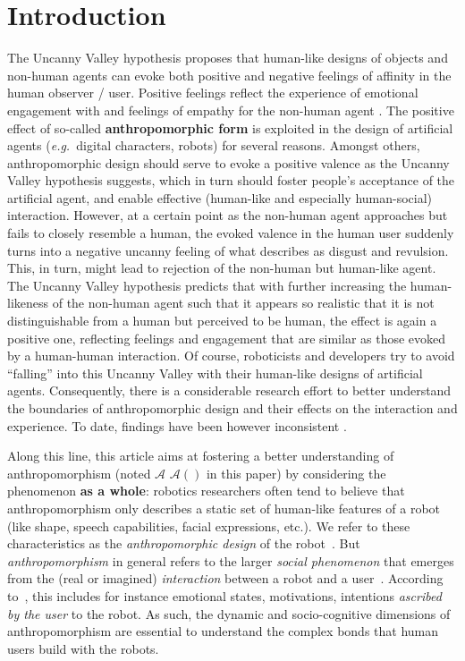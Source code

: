 \documentclass{frontiersSCNS} %
\newcommand{\eg}{{\textit{e.g.~}}}
\newcommand{\Ant}[1][]{%
      \ifthenelse{\isempty{#1}}%
        {$\mathcal{A}$}
        {$\mathcal{A}(#1)$}
}
\begin{document}
\section{Introduction}
\label{sec:intro}

The Uncanny Valley hypothesis \citep{mori_uncanny_1970} proposes that human-like
designs of objects and non-human agents can evoke both positive and negative feelings 
of affinity in the human observer / user. Positive feelings reflect the experience of 
emotional engagement with and feelings of empathy for the non-human agent
\citep{cheetham_human_2011}. The positive effect of so-called
\textbf{anthropomorphic form} is exploited in the design of artificial agents
(\eg digital characters, robots) for several reasons. Amongst others,
anthropomorphic design should serve to evoke a positive valence as the Uncanny
Valley hypothesis suggests, which in turn should foster people's acceptance of
the artificial agent, and enable effective (human-like and especially
human-social) interaction.  However, at a certain point as the non-human agent
approaches but fails to closely resemble a human, the evoked valence in the
human user suddenly turns into a negative uncanny feeling of what
\cite{mori_uncanny_1970} describes as disgust and revulsion. This, in turn,
might lead to rejection of the non-human but human-like agent.  The Uncanny
Valley hypothesis predicts that with further increasing the human-likeness of
the non-human agent such that it appears so realistic that it is not
distinguishable from a human but perceived to be human, the effect is again a
positive one, reflecting feelings and engagement that are similar as those
evoked by a human-human interaction.  Of course, roboticists and developers try
to avoid ``falling'' into this Uncanny Valley with their human-like designs of
artificial agents. Consequently, there is a considerable research effort to
better understand the boundaries of anthropomorphic design and their effects
on the interaction and experience. To date, findings have been however
inconsistent \citep{cheetham_human_2011}.

Along this line, this article aims at fostering a better understanding of
anthropomorphism (noted \Ant in this paper) by considering the phenomenon
\textbf{as a whole}: robotics researchers often tend to believe that
anthropomorphism only describes a static set of human-like features of a robot
(like shape, speech capabilities, facial expressions, etc.). We refer to these
characteristics as the \emph{anthropomorphic design} of the
robot~\cite{fink_anthropomorphism_2012}. But \emph{anthropomorphism} in general
refers to the larger \emph{social phenomenon} that emerges from the (real or
imagined) \emph{interaction} between a robot and a
user~\citep{persson_anthropomorphism_2000}. According to~\cite{epley_when_2008},
this includes for instance emotional states, motivations, intentions
\emph{ascribed by the user} to the robot. As such, the dynamic and
socio-cognitive dimensions of anthropomorphism are essential to understand the
complex bonds that human users build with the robots.
\end{document}

